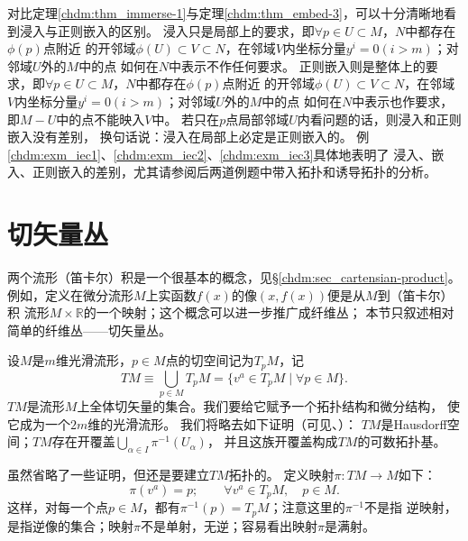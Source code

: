 对比定理\ref{chdm:thm_immerse-1}与定理\ref{chdm:thm_embed-3}，可以十分清晰地看到浸入与正则嵌入的区别。
浸入只是局部上的要求，即$\forall p\in U\subset M$，$N$中都存在$\phi(p)$点附近
的开邻域$\phi(U)\subset V\subset N$，在邻域$V$内坐标分量$y^i=0(i>m)$；对邻域$U$外的$M$中的点
如何在$N$中表示不作任何要求。
正则嵌入则是整体上的要求，即$\forall p\in U\subset M$，$N$中都存在$\phi(p)$点附近
的开邻域$\phi(U)\subset V\subset N$，在邻域$V$内坐标分量$y^i=0(i>m)$；对邻域$U$外的$M$中的点
如何在$N$中表示也作要求，即$M-U$中的点不能映入$V$中。
若只在$p$点局部邻域$U$内看问题的话，则浸入和正则嵌入没有差别，
换句话说：浸入{\kaishu 在局部上}必定是正则嵌入的。
例\ref{chdm:exm_iec1}、\ref{chdm:exm_iec2}、\ref{chdm:exm_iec3}具体地表明了
浸入、嵌入、正则嵌入的差别，尤其请参阅后两道例题中带入拓扑和诱导拓扑的分析。







\section{切矢量丛}\label{chdm:sec_tangent-bundles}
两个流形（笛卡尔）积是一个很基本的概念，见\S \ref{chdm:sec_cartensian-product}。
例如，定义在微分流形$M$上实函数$f(x)$的像$(x,f(x))$便是从$M$到（笛卡尔）积
流形$M\times \mathbb{R}$的一个映射；这个概念可以进一步推广成{\kaishu 纤维丛}；
本节只叙述相对简单的纤维丛——切矢量丛。



设$M$是$m$维光滑流形，$p\in M$点的切空间记为$T_pM$，记
\begin{equation}\label{chdm:eqn_tangent-bundle-set}
    TM \equiv \bigcup _{p\in M} T_pM = \{v^a \in T_pM \mid \forall p\in M\} .
\end{equation}
$TM$是流形$M$上全体切矢量的集合。我们要给它赋予一个拓扑结构和微分结构，
使它成为一个$2m$维的光滑流形。
我们将略去如下证明（可见\parencite[\S 3.1]{chenwh2001}、\parencite[\S 12.1]{tu-IM-2011}）：
$TM$是Hausdorff空间；$TM$存在开覆盖$\bigcup _{\alpha\in I} \pi^{-1} (U_\alpha)$，
并且这族开覆盖构成$TM$的可数拓扑基。

虽然省略了一些证明，但还是要建立$TM$拓扑的。
定义映射$\pi:TM\to M$如下：
\begin{equation}
    \pi(v^a) = p; \qquad \forall v^a\in T_pM,\quad p\in M.
\end{equation}
这样，对每一个点$p\in M$，都有$\pi^{-1}(p)=T_pM$；注意这里的$\pi^{-1}$不是指
逆映射，是指逆像的集合；映射$\pi$不是单射，无逆；容易看出映射$\pi$是满射。

